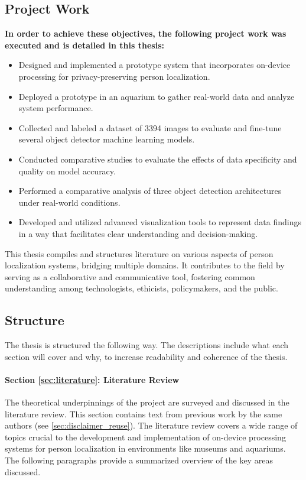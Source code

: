 \subsection{Project Work}
\label{sec:action_points}
\textbf{In order to achieve these objectives, the following project work was executed and is detailed in this thesis:}
\begin{itemize}
    \item Designed and implemented a prototype system that incorporates on-device processing for privacy-preserving person localization.
    \item Deployed a prototype in an aquarium to gather real-world data and analyze system performance.
    \item Collected and labeled a dataset of 3394 images to evaluate and fine-tune several object detector machine learning models.
    \item Conducted comparative studies to evaluate the effects of data specificity and quality on model accuracy.
    \item Performed a comparative analysis of three object detection architectures under real-world conditions.
    \item Developed and utilized advanced visualization tools to represent data findings in a way that facilitates clear understanding and decision-making.
\end{itemize}

This thesis compiles and structures literature on various aspects of person localization systems, bridging multiple domains. It contributes to the field by serving as a collaborative and communicative tool, fostering common understanding among technologists, ethicists, policymakers, and the public.

\subsection{Structure}
\label{sec:structure}
The thesis is structured the following way. The descriptions include what each section will cover and why, to increase readability and coherence of the thesis.

\paragraph{Section \ref{sec:literature}: Literature Review} 
The theoretical underpinnings of the project are surveyed and discussed in the literature review. This section contains text from previous work by the same authors (see \ref{sec:disclaimer_reuse}). The literature review covers a wide range of topics crucial to the development and implementation of on-device processing systems for person localization in environments like museums and aquariums. The following paragraphs provide a summarized overview of the key areas discussed.

